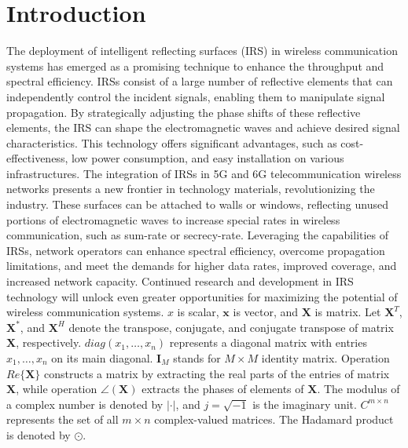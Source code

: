 \documentclass[review]{elsarticle}
\newcommand{\vect}[1]{\mathbf{#1}} %
\newcommand{\mat}[1]{\mathbf{#1}} %
\begin{document}
	\linenumbers
	
	\section{Introduction}
			The deployment of intelligent reflecting surfaces (IRS) in wireless communication systems has emerged as a promising technique to enhance the throughput and spectral efficiency. IRSs consist of a large number of reflective elements that can independently control the incident signals, enabling them to manipulate signal propagation. By strategically adjusting the phase shifts of these reflective elements, the IRS can shape the electromagnetic waves and achieve desired signal characteristics. This technology offers significant advantages, such as cost-effectiveness, low power consumption, and easy installation on various infrastructures. The integration of IRSs in 5G and 6G telecommunication wireless networks presents a new frontier in technology materials, revolutionizing the industry. These surfaces can be attached to walls or windows, reflecting unused portions of electromagnetic waves to increase special rates in wireless communication, such as sum-rate or secrecy-rate. Leveraging the capabilities of IRSs, network operators can enhance spectral efficiency, overcome propagation limitations, and meet the demands for higher data rates, improved coverage, and increased network capacity. Continued research and development in IRS technology will unlock even greater opportunities for maximizing the potential of wireless communication systems. $x$ is scalar, $\vect{x}$ is vector, and $\mat{X}$ is matrix. Let $\mat{X}^T$, $\mat{X}^*$, and $\mat{X}^H$ denote the transpose, conjugate, and conjugate transpose of matrix $\mat{X}$, respectively. ${diag} (x_1, \ldots, x_n)$ represents a diagonal matrix with entries $x_1, \ldots, x_n$ on its main diagonal. $\mat{I}_M$ stands for $M \times M$ identity matrix. Operation ${Re}\{\mat{X}\}$ constructs a matrix by extracting the real parts of the entries of matrix $\mat{X}$, while operation $\angle(\mat{X})$ extracts the phases of elements of $\mat{X}$. The modulus of a complex number is denoted by $|\cdot|$, and $j = \sqrt{-1}$ is the imaginary unit. ${C}^{m \times n}$ represents the set of all $m \times n$ complex-valued matrices. The Hadamard product is denoted by $\odot$.\\
	
\end{document}
